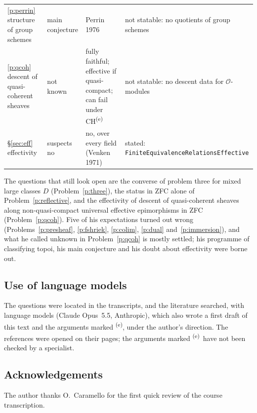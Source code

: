 \documentclass[11pt,a4paper]{amsart}
\theoremstyle{definition}
\theoremstyle{remark}
\newcommand{\own}{\textsuperscript{(e)}}
\newcommand{\lean}[1]{\texttt{#1}}
\begin{document}
\begin{table}[ht]
\begin{tabularx}{\linewidth}{@{}>{\raggedright\arraybackslash}p{3.3cm}>{\raggedright\arraybackslash}p{2.6cm}Y>{\raggedright\arraybackslash}p{3.3cm}@{}}
\ref{p:perrin} structure of group schemes & main conjecture & Perrin 1976 \cite{perrin} & not statable: no quotients of group schemes \\
\ref{p:qcoh} descent of quasi-coherent sheaves & not known & fully faithful; effective if quasi-compact; can fail under CH\own & not statable: no descent data for $\mathcal O$-modules \\
\S\ref{sec:eff} effectivity & suspects no & no, over every field (Venken 1971) \cite{venken,effective} & stated: \lean{Finite\allowbreak Equivalence\allowbreak Relations\allowbreak Effective} \\
\bottomrule
\end{tabularx}
\end{table}

The questions that still look open are the converse of problem three for mixed large classes $D$ (Problem~\ref{p:three}), the status in ZFC alone of Problem~\ref{p:reflective}, and the effectivity of descent of quasi-coherent sheaves along non-quasi-compact universal effective epimorphisms in ZFC (Problem~\ref{p:qcoh}). Five of his expectations turned out wrong (Problems~\ref{p:presheaf}, \ref{p:fshriek}, \ref{p:colim}, \ref{p:dual} and~\ref{p:immersion}), and what he called unknown in Problem~\ref{p:qcoh} is mostly settled; his programme of classifying topoi, his main conjecture and his doubt about effectivity were borne out.

\subsection*{Use of language models}
The questions were located in the transcripts, and the literature searched, with language models (Claude Opus~5.5, Anthropic), which also wrote a first draft of this text and the arguments marked \own, under the author's direction. The references were opened on their pages; the arguments marked \own\ have not been checked by a specialist.

\subsection*{Acknowledgements}
The author thanks O.~Caramello for the first quick review of the course transcription.
\end{document}
